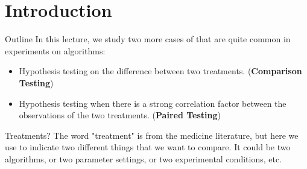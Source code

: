 \section{Introduction}

\begin{frame}[t]{Outline}
  In this lecture, we study two more cases of  that are quite common in experiments on algorithms:\bigskip

  \begin{itemize}
    \item Hypothesis testing on the difference between two treatments. ({\bf Comparison Testing})\medskip
    \item Hypothesis testing when there is a strong correlation factor between the observations of the two treatments. ({\bf Paired Testing})
  \end{itemize}
  \vfill

  \begin{block}{Treatments?}
    {\smaller
    The word "treatment" is from the medicine literature, but here we use to indicate two different things that we want to compare. It could be two algorithms, or two parameter settings, or two experimental conditions, etc.
    }
  \end{block}
\end{frame}

